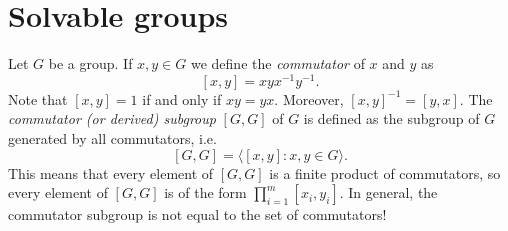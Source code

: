 \section{Solvable groups}
\lecture 

Let $G$ be a group. If $x,y\in G$ we define
the \emph{commutator} of $x$ and $y$ as
\[
[x,y]=xyx^{-1}y^{-1}.
\]
Note that $[x,y]=1$ if and only if $xy=yx$. 
Moreover, $[x,y]^{-1}=[y,x]$. 
The
\emph{commutator (or derived) subgroup} $[G,G]$ of $G$ is defined as
the subgroup of $G$ generated by all commutators, i.e. 
\[
[G,G]=\langle [x,y]:x,y\in G\rangle.
\]
This means that every element of $[G,G]$ is a finite product of commutators, 
so every element of $[G,G]$ is of the form $\prod_{i=1}^m [x_i,y_i]$. 
In general, the commutator subgroup is not equal to the set of commutators!


